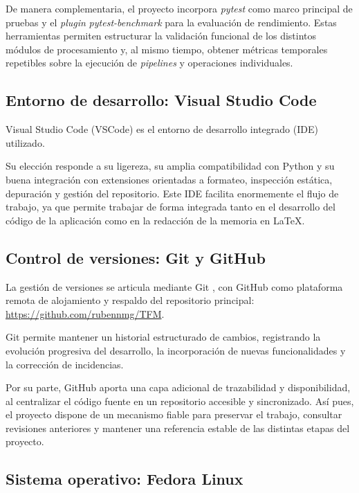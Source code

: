 De manera complementaria, el proyecto incorpora \textit{pytest} \cite{pytest}
como marco principal de pruebas y el \textit{plugin}
\textit{pytest-benchmark} \cite{pytest_benchmark} para la evaluación de
rendimiento. Estas herramientas permiten estructurar la validación funcional de
los distintos módulos de procesamiento y, al mismo tiempo, obtener métricas
temporales repetibles sobre la ejecución de \textit{pipelines} y operaciones
individuales.

\subsection{Entorno de desarrollo: Visual Studio Code}

Visual Studio Code (VSCode) \cite{code} es el entorno de desarrollo integrado (IDE) utilizado.

Su elección responde a su ligereza, su amplia compatibilidad con
Python y su buena integración con extensiones orientadas a formateo,
inspección estática, depuración y gestión del repositorio. Este IDE facilita 
enormemente el flujo de trabajo, ya que permite trabajar de forma integrada 
tanto en el desarrollo del código de la aplicación como en la redacción de la 
memoria en \LaTeX{}.

\subsection{Control de versiones: Git y GitHub}

La gestión de versiones se articula mediante Git \cite{git}, con GitHub \cite{github} como
plataforma remota de alojamiento y respaldo del repositorio principal: \url{https://github.com/rubennmg/TFM}{}.

Git permite mantener un historial estructurado de cambios, registrando la
evolución progresiva del desarrollo, la incorporación de nuevas
funcionalidades y la corrección de incidencias.

Por su parte, GitHub aporta una capa adicional de trazabilidad y disponibilidad,
al centralizar el código fuente en un repositorio accesible y sincronizado. Así
pues, el proyecto dispone de un mecanismo fiable para preservar el trabajo,
consultar revisiones anteriores y mantener una referencia estable de las
distintas etapas del proyecto.

\subsection{Sistema operativo: Fedora Linux}

